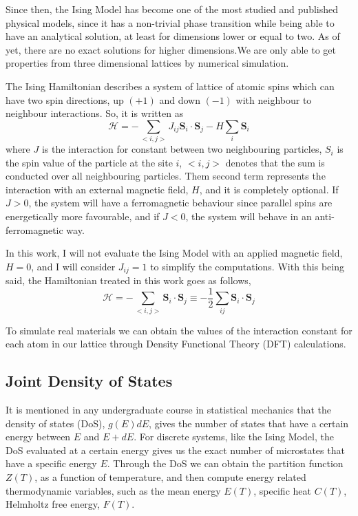 Since then, the Ising Model has become one of the most studied and published physical models, since it has a non-trivial phase transition while being able to have an analytical solution, at least for dimensions lower or equal to two. As of yet, there are no exact solutions for higher dimensions.We are only able to get properties from three dimensional lattices by numerical simulation.

The Ising Hamiltonian describes a system of lattice of atomic spins which can have two spin directions, up $(+1)$ and down $(-1)$ with neighbour to neighbour interactions. So, it is written as
\begin{equation}
	\mathcal{H} = -\sum_{<i,j>} J_{ij} \boldsymbol{S}_i \cdot \boldsymbol{S}_j - H \sum_i\boldsymbol{S}_i
\end{equation}
where $J$ is the interaction for constant between two neighbouring particles, $S_i$ is the spin value of the particle at the site $i$, $<i,j>$ denotes that the sum is conducted over all neighbouring particles. Them second term represents the interaction with an external magnetic field, $H$, and it is completely optional. If $J>0$, the system will have a ferromagnetic behaviour since parallel spins are energetically more favourable, and if $J<0$, the system will behave in an anti-ferromagnetic way.

In this work, I will not evaluate the Ising Model with an applied magnetic field, $H=0$, and I will consider $J_{ij}=1$ to simplify the computations. With this being said, the Hamiltonian treated in this work goes as follows,
\begin{equation}
	\mathcal{H} = -\sum_{<i,j>} \boldsymbol{S}_i \cdot \boldsymbol{S}_j 	\equiv -\frac{1}{2} \sum_{ij} \boldsymbol{S}_i \cdot \boldsymbol{S}_j
\end{equation}

To simulate real materials we can obtain the values of the interaction constant for each atom in our lattice through Density Functional Theory (DFT) calculations.

\subsection{Joint Density of States}

It is mentioned in any undergraduate course in statistical mechanics that the density of states (DoS), $g(E)dE$, gives the number of states that have a certain energy between $E$ and $E+dE$. For discrete systems, like the Ising Model, the DoS evaluated at a certain energy gives us the exact number of microstates that have a specific energy $E$. Through the DoS we can obtain the partition function $Z(T)$, as a function of temperature, and then compute energy related thermodynamic variables, such as the mean energy $E(T)$, specific heat $C(T)$, Helmholtz free energy, $F(T)$. 

